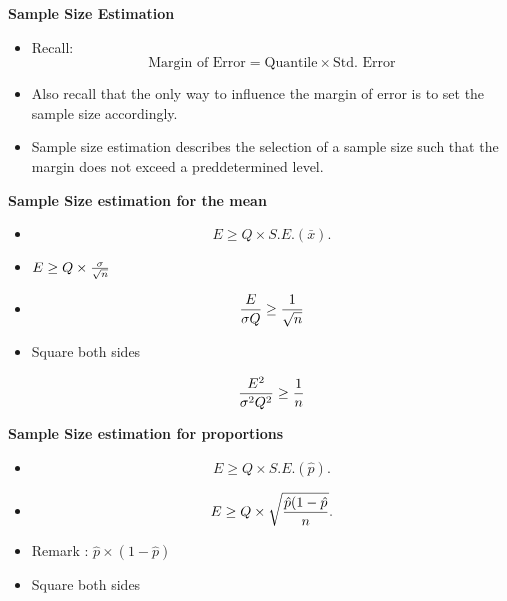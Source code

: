 \documentclass[]{report}
\begin{document}

\textbf{Sample Size Estimation}

\begin{itemize} \item Recall:
\[  \mbox{Margin of Error}  = \mbox{Quantile} \times \mbox{Std. Error}\]

\item Also recall that the only way to influence the margin of error is to set the sample size accordingly.

\item Sample size estimation describes the selection of a sample size such that the margin does not exceed a preddetermined level.
\end{itemize}



\textbf{Sample Size estimation for the mean}

\begin{itemize}
\item \[ E \geq Q \times S.E.(\bar{x}). \]

\item 
$E \geq Q \times {\sigma \over \sqrt{n} }$

\item
\[ \frac{E}{\sigma Q} \geq {1 \over \sqrt{n} } \]

\item Square both sides


\[ \frac{E^2}{\sigma^2 Q^2} \geq {1 \over n } \]


\end{itemize}



\textbf{Sample Size estimation for proportions}

\begin{itemize}
\item \[ E \geq Q \times S.E.(\hat{p}). \]

\item 
\[ E \geq Q \times \sqrt{{\hat{p}(1-\hat{p} \over n}}. \]

\item Remark : $\hat{p} \times (1-\hat{p})$

\item Square both sides



\end{itemize}
\end{document}

